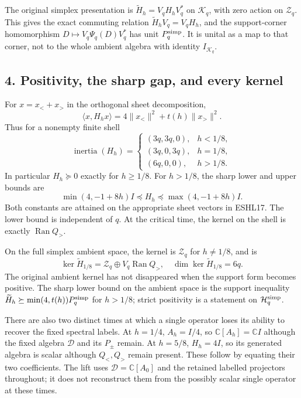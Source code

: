 \documentclass[
  10pt,
  a4paper,
]{article}
\begin{document}
The original simplex presentation is \(\widetilde H_h=V_qH_hV_q^*\) on
\(\mathcal K_q\), with zero action on \(\mathcal Z_q\). This gives the
exact commuting relation \(\widetilde H_hV_q=V_qH_h\), and the
support-corner homomorphism \(D\mapsto V_q\Psi_q(D)V_q^*\) has unit
\(P_q^{\rm simp}\). It is unital as a map to that corner, not to the
whole ambient algebra with identity \(I_{\mathcal K_q}\).

\subsection{4. Positivity, the sharp gap, and every
kernel}\label{positivity-the-sharp-gap-and-every-kernel}

For \(x=x_<+x_>\) in the orthogonal sheet decomposition, \[
\langle x,H_hx\rangle=4\|x_<\|^2+t(h)\|x_>\|^2.
\tag{ESHL17}
\] Thus for a nonempty finite shell \[
\operatorname{inertia}(H_h)=
\begin{cases}
(3q,3q,0),&h<1/8,\\
(3q,0,3q),&h=1/8,\\
(6q,0,0),&h>1/8.
\end{cases}
\tag{ESHL18}
\] In particular \(H_h\succeq0\) exactly for \(h\ge1/8\). For \(h>1/8\),
the sharp lower and upper bounds are \[
\boxed{\min(4,-1+8h)I\preceq H_h
\preceq\max(4,-1+8h)I.}
\tag{ESHL19}
\] Both constants are attained on the appropriate sheet vectors in
ESHL17. The lower bound is independent of \(q\). At the critical time,
the kernel on the shell is exactly \(\operatorname{Ran}Q_>\).

On the full simplex ambient space, the kernel is \(\mathcal Z_q\) for
\(h\ne1/8\), and is \[
\ker\widetilde H_{1/8}=\mathcal Z_q\oplus V_q\operatorname{Ran}Q_>,
\quad\dim\ker\widetilde H_{1/8}=6q.
\tag{ESHL20}
\] The original ambient kernel has not disappeared when the support form
becomes positive. The sharp lower bound on the ambient space is the
support inequality \(\widetilde H_h\succeq\min(4,t(h))P_q^{\rm simp}\)
for \(h>1/8\); strict positivity is a statement on
\(\mathcal H_q^{\rm simp}\).

There are also two distinct times at which a single operator loses its
ability to recover the fixed spectral labels. At \(h=1/4\), \(A_h=I/4\),
so \(\mathbb C[A_h]=\mathbb CI\) although the fixed algebra
\(\mathcal D\) and its \(P_\pm\) remain. At \(h=5/8\), \(H_h=4I\), so
its generated algebra is scalar although \(Q_<,Q_>\) remain present.
These follow by equating their two coefficients. The lift uses
\(\mathcal D=\mathbb C[A_0]\) and the retained labelled projectors
throughout; it does not reconstruct them from the possibly scalar single
operator at these times.
\end{document}
